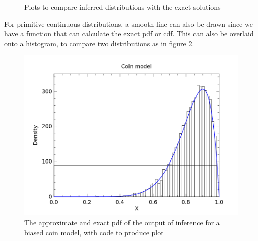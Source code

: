 \begin{figure}[!htb]
	\centering
	\qquad
	\caption{Plots to compare inferred distributions with the exact solutions}
	\label{fig:vis-qq}
\end{figure}
	
For primitive continuous distributions, a smooth line can also be drawn since we have a function that can calculate the exact pdf or cdf. This can also be overlaid onto a histogram, to compare two distributions as in figure \ref{fig:vis-samples}.
	
\begin{figure}[!htb]
	\centering														
	\begin{minipage}{0.45\textwidth}
		\centering
	\end{minipage}
	\begin{minipage}{0.45\textwidth}
		\centering
		\includegraphics[width=\linewidth]{figs/coin_compare.png}
	\end{minipage}
	\caption{The approximate and exact pdf of the output of inference for a biased coin model, with code to produce plot}
	\label{fig:vis-samples}
\end{figure}
	
